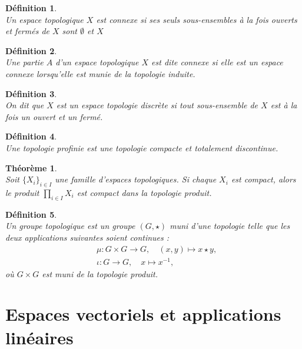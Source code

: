 \documentclass[a4paper, 14pt]{report}
\newtheorem{definition}{Définition}[section]
\newtheorem{theorem}{Théorème}[section]
\begin{document}
\begin{onehalfspace}
{\begin{definition} \cite{bourbaki2013general}\\
Un espace topologique \( X \) est connexe si ses seuls sous-ensembles à la fois ouverts et fermés de \( X \) sont \( \emptyset \) et \( X \)
\end{definition}


\begin{definition} \cite{kuratowski2014topology}\\
Une partie \( A \) d'un espace topologique \( X \) est dite connexe si elle est un espace connexe lorsqu'elle est munie de la topologie induite.
\end{definition}

\begin{definition} \cite{kuratowski2014topology}\\
On dit que \( X \) est un espace topologie discrète si tout sous-ensemble de \( X \) est à la fois un ouvert et un fermé.
\end{definition}

\begin{definition} \cite{bourbaki2013general}\\
Une topologie profinie est une topologie compacte et totalement discontinue.
\end{definition}

\begin{theorem}	\cite{bourbaki2013general}\\
Soit \( \{ X_i \}_{i \in I} \) une famille d'espaces topologiques. Si chaque \( X_i \) est compact, alors le produit \( \prod_{i \in I} X_i \) est compact dans la topologie produit.	
\end{theorem}



\begin{definition}\cite{husain2018introduction}\\
Un groupe topologique est un groupe \( (G, \star) \) muni d'une topologie telle que les deux applications suivantes soient continues :
	\[
	\begin{aligned}
		&\mu : G \times G \to G,\quad (x, y) \mapsto x \star y, \\
		&\iota : G \to G,\quad x \mapsto x^{-1},
	\end{aligned}
	\]
	où \( G \times G \) est muni de la topologie produit.
\end{definition}



\section{Espaces vectoriels et applications linéaires}
}
\end{onehalfspace}
\end{document}
